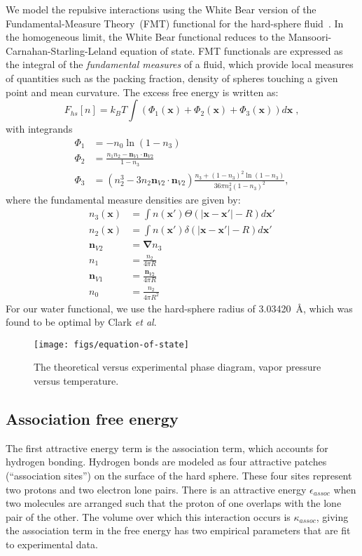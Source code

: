 \documentclass[letterpaper,twocolumn,amsmath,amssymb,prb]{revtex4-1}
\newcommand{\xx}{\textbf{x}}
\begin{document}
We model the repulsive interactions using the White Bear version of
the Fundamental-Measure Theory~(FMT) functional for the hard-sphere
fluid~\cite{roth2002whitebear}.  In the homogeneous limit, the White
Bear functional reduces to the Mansoori-Carnahan-Starling-Leland
equation of state.  FMT functionals are expressed as the integral of
the \emph{fundamental measures} of a fluid, which provide local
measures of quantities such as the packing fraction, density of
spheres touching a given point and mean curvature.  The excess free
energy is written as:
\begin{equation}
F_{hs}[n] = k_B T \int (\Phi_1(\xx) + \Phi_2(\xx) + \Phi_3(\xx)) d\xx \; ,
\end{equation}
with integrands
\begin{align}
\Phi_1 &= -n_0 \ln\left( 1 - n_3\right)\\
\Phi_2 &= \frac{n_1 n_2 - \mathbf{n}_{V1} \cdot\mathbf{n}_{V2}}{1-n_3} \\
\Phi_3 &= (n_2^3 - 3n_2 \mathbf{n}_{V2} \cdot \mathbf{n}_{V2})
  \frac{
    n_3 + (1-n_3)^2\ln(1-n_3)
  }{
    36\pi n_3^2\left( 1 - n_3 \right)^2
  } ,
\end{align}
where the fundamental measure densities are given by:
\begin{align}
  n_3(\xx) &= \int n(\xx') \Theta(\left|\xx - \xx'\right| - R) d\xx' \\
  n_2(\xx) &= \int n(\xx') \delta(\left|\xx - \xx'\right| - R) d\xx'
  \\
  \mathbf{n}_{V2} &= \mathbf{\nabla} n_3 \\
  n_1 &= \frac{n_2}{4\pi R}\\
  \mathbf{n}_{V1} &= \frac{\mathbf{n}_{V2}}{4\pi R}\\
  n_0 &= \frac{n_2}{4\pi R^2}
\end{align}
For our water functional, we use the hard-sphere radius of
3.03420~\AA, which was found to be optimal by Clark
\emph{et al}.\cite{clark2006developing}

\begin{figure}
\begin{center}
\texttt{[image: figs/equation-of-state]}
\end{center}
\caption{The theoretical versus experimental phase diagram, vapor
  pressure versus temperature.  }
\label{fig:equation-of-state}
\end{figure}

\subsection{Association free energy}
The first attractive energy term is the association term, which
accounts for hydrogen bonding.  Hydrogen bonds are modeled as four
attractive patches (``association sites'') on the surface of the hard
sphere.  These four sites represent two protons and two electron lone
pairs.  There is an attractive energy $\epsilon_\textit{assoc}$ when
two molecules are arranged such that the proton of one overlaps
with the lone pair of the other.  The volume over which this
interaction occurs is $\kappa_\textit{assoc}$, giving the association
term in the free energy has two empirical parameters that are fit to
experimental data.
\end{document}
